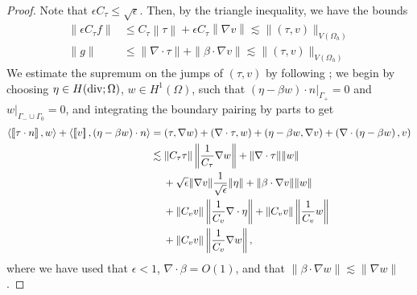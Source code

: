 \documentclass[11pt,onecolumn]{scrartcl}
\newcommand{\nor}[1]{\left\| #1 \right\|}
\newcommand{\LRs}[1]{\left[ #1 \right]}
\newcommand{\jump}[1] {\ensuremath{\LRs{\![#1]\!}}}
\newcommand{\Oh}{\Omega_h}
\newcommand{\grad}{\nabla}
\renewcommand{\div}{\grad \cdot}
\begin{document}
\begin{proof}
Note that $\epsilon C_\tau \leq \sqrt{\epsilon}$. Then, by the triangle inequality, we have the bounds
\begin{align*}
\|\epsilon C_\tau f \| &\leq C_\tau \nor{ \tau} + \epsilon C_\tau \nor{\grad v} \lesssim \| \left(\tau,v\right)\|_{V(\Oh)}\\
\|g \| &\leq \|\div \tau\| +  \|\beta \cdot \grad v\| \lesssim \| \left(\tau,v\right)\|_{V(\Oh)}
\end{align*}
We estimate the supremum on the jumps of $\left(\tau,v\right)$ by following \cite{DPGrobustness}; we begin by choosing $\eta \in H({\rm div}; \Omega)$, $w\in H^1(\Omega)$, such that $\left.\left(\eta-\beta w \right)\cdot n\right |_{\Gamma_+} = 0$ and $\left.w\right |_{\Gamma_-\cup\Gamma_0} = 0$, and integrating the boundary pairing by parts to get
\begin{align*}
\langle \jump{\tau\cdot n},w\rangle + \langle \jump{v},\left(\eta - \beta w\right)\cdot n\rangle &= (\tau,\grad w) + (\div \tau, w) + \left(\eta - \beta w, \grad v\right) +  \left(\div \left(\eta - \beta w\right), v\right)\\
&\lesssim \|C_\tau\tau\| \nor{ \frac{1}{C_\tau}\grad w} + \|\div \tau\| \|w\| \\
&\left.\hspace{.3cm}\right. + \sqrt{\epsilon}\| \grad v \|\frac{1}{\sqrt{\epsilon}}\|\eta\| +  \|\beta \cdot \grad v\| \| w\|\\
&\left.\hspace{.3cm}\right. + \|C_vv\|\nor{\frac{1}{C_v}\div \eta} + \| C_vv\| \nor{\frac{1}{C_v}w} \\
&\left.\hspace{.3cm}\right. + \|C_v v\| \nor{\frac{1}{C_v} \grad w},
\end{align*}
where we have used that $\epsilon < 1$, $\div \beta = O(1)$, and that $\|\beta\cdot \grad w\|\lesssim \|\grad w\|$.  


\end{proof}
\end{document}
